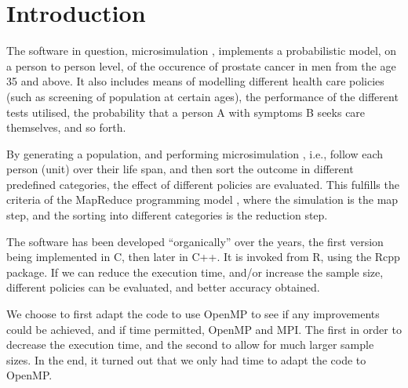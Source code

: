 \section{Introduction}

The software in question, microsimulation \cite{microsimulation}, implements
a probabilistic model, on a person to person level, of the occurence
of prostate cancer in men from the age 35 and above. It also includes
means of modelling different health care policies (such as screening
of population at certain ages), the performance of the different tests
utilised, the probability that a person A with symptoms B seeks care
themselves, and so forth.

By generating a population, and performing microsimulation \citep{gulati_calibrating_2010},
i.e., follow each person (unit) over their life span, and then sort
the outcome in different predefined categories, the effect of
different policies are evaluated. This fulfills the criteria of the
MapReduce programming model \cite{MapReduce:2004}, where the
simulation is the map step, and the sorting into different categories
is the reduction step.

The software has been developed ``organically'' over the years, the
first version being implemented in C, then later in C++. It is invoked
from R, using the Rcpp \citep{rcpp} package. If we can reduce the execution
time, and/or increase the sample size, different policies can be
evaluated, and better accuracy obtained.

We choose to first adapt the code to use OpenMP to see if any
improvements could be achieved, and if time permitted, OpenMP and
MPI. The first in order to decrease the execution time, and the second
to allow for much larger sample sizes. In the end, it turned out that
we only had time to adapt the code to OpenMP.







